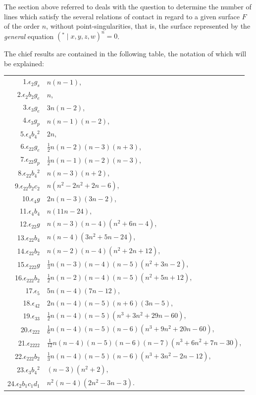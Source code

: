 \documentclass[11pt,a4paper,english]{article}
\theoremstyle{plain}
\begin{document}
The section above referred to deals with the question to determine the number of lines which satisfy the several relations of contact in regard to a given surface $F$ of the order $n$, without point-singularities, that is, the surface represented by the \textit{general} equation $({}^*\mid x, y, z, w)^n = 0$.

The chief results are contained in the following table, the notation of which will be explained:

\begin{center}
\begin{tabular}{r @{\ $=$\ }l}
1.\quad $\epsilon_2 g_s$ & $n(n-1)$, \\[2pt]
2.\quad $\epsilon_2 b_2 g_e$ & $n$, \\[2pt]
3.\quad $\epsilon_3 g_e$ & $3n(n-2)$, \\[2pt]
4.\quad $\epsilon_3 g_p$ & $n(n-1)(n-2)$, \\[2pt]
5.\quad $\epsilon_4 b_4{}^2$ & $2n$, \\[2pt]
6.\quad $\epsilon_{22} g_e$ & $\frac{1}{2}n(n-2)(n-3)(n+3)$, \\[2pt]
7.\quad $\epsilon_{22} g_p$ & $\frac{1}{2}n(n-1)(n-2)(n-3)$, \\[2pt]
8.\quad $\epsilon_{22} b_4{}^2$ & $n(n-3)(n+2)$, \\[2pt]
9.\quad $\epsilon_{22} b_2 c_2$ & $n(n^2 - 2n^2 + 2n - 6)$, \\[2pt]
10.\quad $\epsilon_4 g$ & $2n(n-3)(3n-2)$, \\[2pt]
11.\quad $\epsilon_4 b_4$ & $n(11n - 24)$, \\[2pt]
12.\quad $\epsilon_{22} g$ & $n(n-3)(n-4)(n^2 + 6n - 4)$, \\[2pt]
13.\quad $\epsilon_{22} b_4$ & $n(n-4)(3n^2 + 5n - 24)$, \\[2pt]
14.\quad $\epsilon_{22} b_2$ & $n(n-2)(n-4)(n^2 + 2n + 12)$, \\[2pt]
15.\quad $\epsilon_{222} g$ & $\frac{1}{3}n(n-3)(n-4)(n-5)(n^2 + 3n - 2)$, \\[2pt]
16.\quad $\epsilon_{222} b_2$ & $\frac{1}{2}n(n-2)(n-4)(n-5)(n^2 + 5n + 12)$, \\[2pt]
17.\quad $\epsilon_5$ & $5n(n-4)(7n - 12)$, \\[2pt]
18.\quad $\epsilon_{42}$ & $2n(n-4)(n-5)(n+6)(3n-5)$, \\[2pt]
19.\quad $\epsilon_{33}$ & $\frac{1}{2}n(n-4)(n-5)(n^3 + 3n^2 + 29n - 60)$, \\[2pt]
20.\quad $\epsilon_{222}$ & $\frac{1}{6}n(n-4)(n-5)(n-6)(n^3 + 9n^2 + 20n - 60)$, \\[2pt]
21.\quad $\epsilon_{2222}$ & $\frac{1}{12}n(n-4)(n-5)(n-6)(n-7)(n^3 + 6n^2 + 7n - 30)$, \\[2pt]
22.\quad $\epsilon_{222} b_2$ & $\frac{1}{3}n(n-4)(n-5)(n-6)(n^3 + 3n^2 - 2n - 12)$, \\[2pt]
23.\quad $\epsilon_3 b_4{}^2$ & $(n-3)(n^2 + 2)$, \\[2pt]
24.\quad $\epsilon_2 b_1 c_1 d_1$ & $n^2(n-4)(2n^2 - 3n - 3)$.
\end{tabular}
\end{center}
\end{document}

